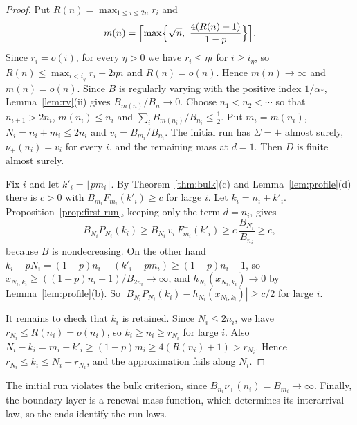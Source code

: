\begin{proof}
Put $R(n)=\max_{1\le i\le2n}r_i$ and
\[
 m(n)=\Bigl\lceil\max\Bigl\{\sqrt n,\ \frac{4(R(n)+1)}{1-p}\Bigr\}\Bigr\rceil .
\]
Since $r_i=o(i)$, for every $\eta>0$ we have $r_i\le\eta i$ for $i\ge i_\eta$, so
$R(n)\le\max_{i<i_\eta}r_i+2\eta n$ and $R(n)=o(n)$. Hence $m(n)\to\infty$ and
$m(n)=o(n)$. Since $B$ is regularly varying with the positive index $1/\alpha_*$,
Lemma~\ref{lem:rv}(ii) gives $B_{m(n)}/B_n\to0$. Choose $n_1<n_2<\cdots$ so that
$n_{i+1}>2n_i$, $m(n_i)\le n_i$ and $\sum_iB_{m(n_i)}/B_{n_i}\le\frac12$. Put
$m_i=m(n_i)$, $N_i=n_i+m_i\le2n_i$ and $v_i=B_{m_i}/B_{n_i}$. The initial run has
$\Sigma=\plus$ almost surely, $\nu_\plus(n_i)=v_i$ for every $i$, and the remaining mass
at $d=1$. Then $D$ is finite almost surely.

Fix $i$ and let $k'_i=\lfloor pm_i\rfloor$. By Theorem~\ref{thm:bulk}(c) and
Lemma~\ref{lem:profile}(d) there is $c>0$ with $B_{m_i}F^\minus_{m_i}(k'_i)\ge c$ for
large $i$. Let $k_i=n_i+k'_i$. Proposition~\ref{prop:first-run}, keeping only the term
$d=n_i$, gives
\[
 B_{N_i}P_{N_i}(k_i)\ge B_{N_i}\,v_i\,F^\minus_{m_i}(k'_i)\ge c\,\frac{B_{N_i}}{B_{n_i}}\ge c,
\]
because $B$ is nondecreasing. On the other hand
$k_i-pN_i=(1-p)n_i+(k'_i-pm_i)\ge(1-p)n_i-1$, so
$x_{N_i,k_i}\ge((1-p)n_i-1)/B_{2n_i}\to\infty$, and
$h_{N_i}(x_{N_i,k_i})\to0$ by Lemma~\ref{lem:profile}(b). So
$|B_{N_i}P_{N_i}(k_i)-h_{N_i}(x_{N_i,k_i})|\ge c/2$ for large $i$.

It remains to check that $k_i$ is retained. Since $N_i\le2n_i$, we have
$r_{N_i}\le R(n_i)=o(n_i)$, so $k_i\ge n_i\ge r_{N_i}$ for large $i$. Also
$N_i-k_i=m_i-k'_i\ge(1-p)m_i\ge4(R(n_i)+1)>r_{N_i}$. Hence
$r_{N_i}\le k_i\le N_i-r_{N_i}$, and the approximation fails along $N_i$.
\end{proof}

The initial run violates the bulk criterion, since
$B_{n_i}\nu_\plus(n_i)=B_{m_i}\to\infty$.
\ifarxivbuild
Finally, the boundary layer is a renewal mass
function, which determines its interarrival law, so the ends identify the run laws.

